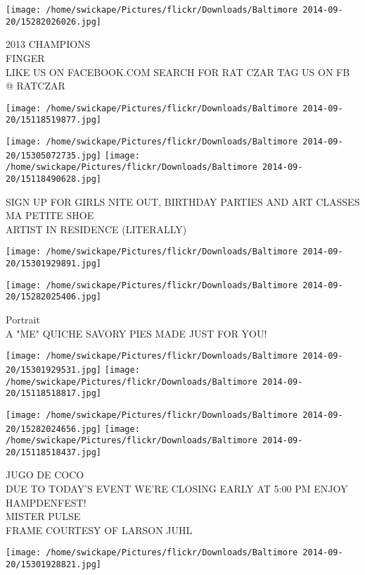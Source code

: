 \documentclass[10pt,letterpaper]{article}
\begin{document}
\texttt{[image: /home/swickape/Pictures/flickr/Downloads/Baltimore 2014-09-20/15282026026.jpg]}

2013 CHAMPIONS\\
FINGER\\
LIKE US ON FACEBOOK.COM SEARCH FOR RAT CZAR TAG US ON FB @ RATCZAR
\pagebreak

\texttt{[image: /home/swickape/Pictures/flickr/Downloads/Baltimore 2014-09-20/15118519877.jpg]}

\vspace{0.25in}
\texttt{[image: /home/swickape/Pictures/flickr/Downloads/Baltimore 2014-09-20/15305072735.jpg]}
\texttt{[image: /home/swickape/Pictures/flickr/Downloads/Baltimore 2014-09-20/15118490628.jpg]}

SIGN UP FOR GIRLS NITE OUT, BIRTHDAY PARTIES AND ART CLASSES\\
MA PETITE SHOE\\
ARTIST IN RESIDENCE (LITERALLY)
\pagebreak

\texttt{[image: /home/swickape/Pictures/flickr/Downloads/Baltimore 2014-09-20/15301929891.jpg]}

\vspace{0.25in}
\texttt{[image: /home/swickape/Pictures/flickr/Downloads/Baltimore 2014-09-20/15282025406.jpg]}

Portrait\\
A "ME" QUICHE SAVORY PIES MADE JUST FOR YOU!
\pagebreak

\texttt{[image: /home/swickape/Pictures/flickr/Downloads/Baltimore 2014-09-20/15301929531.jpg]}
\texttt{[image: /home/swickape/Pictures/flickr/Downloads/Baltimore 2014-09-20/15118518817.jpg]}

\texttt{[image: /home/swickape/Pictures/flickr/Downloads/Baltimore 2014-09-20/15282024656.jpg]}
\texttt{[image: /home/swickape/Pictures/flickr/Downloads/Baltimore 2014-09-20/15118518437.jpg]}

JUGO DE COCO\\
DUE TO TODAY'S EVENT WE'RE CLOSING EARLY AT 5:00 PM ENJOY HAMPDENFEST!\\
MISTER PULSE\\
FRAME COURTESY OF LARSON JUHL
\pagebreak

\texttt{[image: /home/swickape/Pictures/flickr/Downloads/Baltimore 2014-09-20/15301928821.jpg]}
\end{document}
